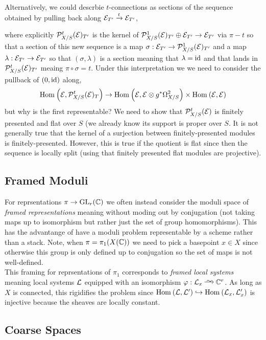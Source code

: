 \documentclass[12pt]{article}
\begin{document}
\begin{rmk}
Alternatively, we could descrbie $t$-connections  as sections of the sequence obtained by pulling back along $\mathcal{E}_{T'} \xrightarrow{t} \mathcal{E}_{T'}$,
\begin{center}
\end{center}
where explicitly $\mathcal{P}^{t}_{X/S}(\mathcal{E})_{T'}$ is the kernel of $\mathcal{P}^1_{X/S}(\mathcal{E})_{T'} \oplus \mathcal{E}_{T'} \to \mathcal{E}_{T'}$ via $\pi - t$ so that a section of this new sequence is a map $\sigma : \mathcal{E}_{T'} \to \mathcal{P}^1_{X/S}(\mathcal{E})_{T'}$ and a map $\lambda : \mathcal{E}_{T'} \to \mathcal{E}_{T'}$ so that $(\sigma, \lambda)$ is a section meaning that $\lambda = \mathrm{id}$ and that lands in $\mathcal{P}^{t}_{X/S}(\mathcal{E})_{T'}$ meaing $\pi \circ \sigma = t$. Under this interpretation we we need to consider the pullback of $(0, \mathrm{id})$ along,
\[ \mathrm{Hom}_{} \left( \mathcal{E}, \mathcal{P}^t_{X/S}(\mathcal{E})_{T} \right) \to \mathrm{Hom}_{} \left( \mathcal{E}, \mathcal{E} \otimes g^* \Omega^2_{X/S} \right) \times \mathrm{Hom}_{} \left( \mathcal{E}, \mathcal{E} \right) \]
but why is the first representable? We need to show that $\mathcal{P}^t_{X/S}(\mathcal{E})$ is finitely presented and flat over $S$ (we already know its support is proper over $S$. It is not generally true that the kernel of a surjection between finitely-presented modules is finitely-presented. However, this is true if the quotient is flat since then the sequence is locally split (using that finitely presented flat modules are projective).
\end{rmk}

\subsection{Framed Moduli}

For reprsentations $\pi \to \mathrm{GL}_r(\mathbb{C})$ we often instead consider the moduli space of \textit{framed representations} meaning without moding out by conjugation (not taking maps up to isomorphism but rather just the set of group homomorphisms). This has the advantange of have a moduli problem representable by a scheme rather than a stack. Note, when $\pi = \pi_1(X(\mathbb{C}))$ we need to pick a basepoint $x \in X$ since otherwise this group is only defined up to conjugation so the set of maps is not well-defined.
\bigskip\\
This framing for reprsentations of $\pi_1$ corresponds to \textit{framed local systems} meaning local systems $\mathcal{L}$ equipped with an isomorphism $\varphi : \L_x \iso \CC^r$. As long as $X$ is connected, this rigidifies the problem since $\mathrm{Hom}_{} \left( \mathcal{L}, \mathcal{L}' \right) \hookrightarrow \mathrm{Hom}_{} \left( \mathcal{L}_x, \mathcal{L}_x' \right)$ is injective because the sheaves are locally constant. 

\subsection{Coarse Spaces}
\end{document}
